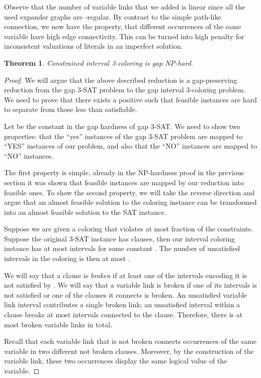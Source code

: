 \documentclass[a4paper,11pt]{article}
\theoremstyle{theorem}
\newtheorem{theorem}{Theorem}
\begin{document}
Observe that the number of variable links that we added is linear
since all the used expander graphs are -regular.
By contrast to the simple path-like connection, we now have the property,
that different occurrences of the same variable have high edge connectivity.
This can be turned into high penalty for inconsistent valuations 
of literals in an imperfect solution.  

\begin{theorem}
Constrained interval 3-coloring is gap NP-hard.
\end{theorem}

\begin{proof}
We will argue that the above described reduction is a gap-preserving reduction from
the gap 3-SAT problem to the gap interval 3-coloring problem. We need to prove that
there exists a positive  such that feasible instances are hard to separate from
those less than  satisfiable.

Let  be the constant in the gap hardness of gap 3-SAT.
We need to show two properties: that the ``yes'' instances of the gap 3-SAT problem
are mapped to ``YES'' instances of our problem, and also that the ``NO''
instances are mapped to ``NO'' instances. 

The first property is simple, already in the NP-hardness proof in the previous section
it was shown that feasible instances are mapped by our reduction into feasible ones.  
To show the second property, we will take the reverse direction and argue that
an almost feasible solution to the coloring instance can be transformed into an almost feasible
solution to the SAT instance.

Suppose we are given a coloring  that violates at most  fraction of the constraints.
Suppose the original 3-SAT instance has  clauses, then our interval coloring instance has at most 
intervals for some constant . The number of unsatisfied intervals in the coloring  is then at most .

We will say that a clause is \emph{broken} if at least one of the intervals encoding it is not satisfied by . 
We will say that a variable link is broken if one of its intervals is not satisfied or one of the clauses it connects is broken. An unsatisfied variable link interval contributes a single broken link; an unsatisfied interval within a clause breaks at most  intervals connected to the clause. Therefore, there is at most  broken
variable links in total.

Recall that each variable link that is not broken connects
occurrences of the same variable in two different not broken clauses. 
Moreover, by the construction of the variable link, these two occurrences 
display the same logical value of the variable.


\end{proof}
\end{document}
